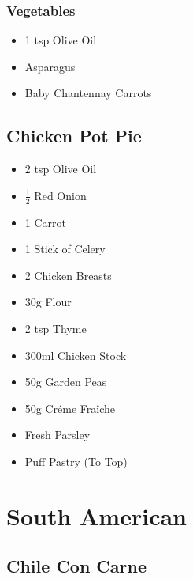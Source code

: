 \documentclass[11pt, english]{article}
\begin{document}
		\subsubsection*{Vegetables}

	\begin{itemize}
        \setlength\itemsep{0cm}
		\item 1 tsp Olive Oil
                \item Asparagus
		\item Baby Chantennay Carrots
        \end{itemize}

\newpage

	\subsection{Chicken Pot Pie}

	\begin{itemize}
	\setlength\itemsep{0cm}
		\item 2 tsp Olive Oil
		\item $\frac{1}{2}$ Red Onion
		\item 1 Carrot
		\item 1 Stick of Celery
		\item 2 Chicken Breasts
		\item 30g Flour
		\item 2 tsp Thyme
		\item 300ml Chicken Stock
		\item 50g Garden Peas
		\item 50g Cr\'{e}me Fra\^{i}che
		\item Fresh Parsley
		\item Puff Pastry (To Top)
	\end{itemize}

\newpage

\section{South American}

	\subsection{Chile Con Carne}
\end{document}
